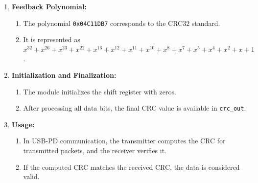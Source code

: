 \begin{enumerate}
    \item \textbf{Feedback Polynomial:}
    \begin{enumerate}
        \item The polynomial \texttt{0x04C11DB7} corresponds to the CRC32 standard.
        \item It is represented as \(x^{32} + x^{26} + x^{23} + x^{22} + x^{16} + x^{12} + x^{11} + x^{10} + x^8 + x^7 + x^5 + x^4 + x^2 + x + 1\).
    \end{enumerate}

    \item \textbf{Initialization and Finalization:}
    \begin{enumerate}
        \item The module initializes the shift register with zeros.
        \item After processing all data bits, the final CRC value is available in \texttt{crc\_out}.
    \end{enumerate}

    \item \textbf{Usage:}
    \begin{enumerate}
        \item In USB-PD communication, the transmitter computes the CRC for transmitted packets, and the receiver verifies it.
        \item If the computed CRC matches the received CRC, the data is considered valid.
    \end{enumerate}
\end{enumerate}


